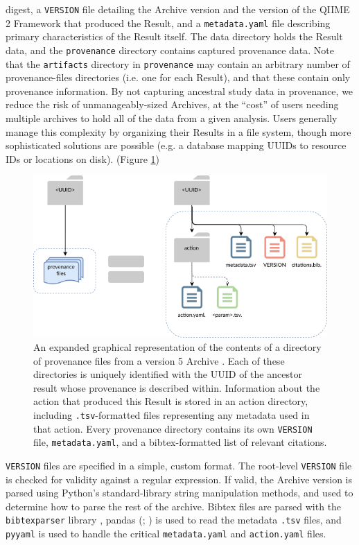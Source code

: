 digest, a \texttt{VERSION} file detailing the Archive version and the version of the
QIIME 2 Framework that produced the Result, and a \texttt{metadata.yaml} file describing
primary characteristics of the Result itself. The data directory holds the
Result data, and the \texttt{provenance} directory contains captured provenance data.
Note that the \texttt{artifacts} directory in \texttt{provenance} may contain an arbitrary number of
provenance-files directories (i.e. one for each Result), and that these contain only provenance
information. By not capturing ancestral study data in provenance, we reduce the risk
of unmanageably-sized Archives, at the “cost” of users needing multiple archives
to hold all of the data from a given analysis. Users generally manage this
complexity by organizing their Results in a file system, though more
sophisticated solutions are possible (e.g. a database mapping UUIDs to resource
IDs or locations on disk). (Figure \ref{fig:provenance_files})

\begin{figure}[htp]
\centering
\includegraphics[width=\textwidth]{figures/prov_files.png}
\caption[Diagram of the provenance file directories in a QIIME 2 Archive]%
{An expanded graphical representation of the contents of a directory of
provenance files from a version 5 Archive \parencite{qiime_2_development_team_archive_2018}.
Each of these directories is uniquely
identified with the UUID of the ancestor result whose provenance is described
within. Information about the action that produced this Result is stored in an
action directory, including \texttt{.tsv}-formatted files representing any metadata used
in that action. Every provenance directory contains its own \texttt{VERSION} file,
\texttt{metadata.yaml}, and a bibtex-formatted list of relevant citations.}
\label{fig:provenance_files}
\end{figure}
\texttt{VERSION} files are specified in a simple, custom format. The root-level \texttt{VERSION}
file is checked for validity against a regular expression. If valid, the Archive
version is parsed using Python’s standard-library string manipulation methods,
and used to determine how to parse the rest of the archive. Bibtex files are
parsed with the \texttt{bibtexparser} library \parencite{boulogne_bibtexparser_nodate},
pandas (\cite{reback_pandas-devpandas_2020}; \cite{mckinney_data_2010}) is used to read the
metadata \texttt{.tsv} files, and \texttt{pyyaml} is used to handle the critical \texttt{metadata.yaml} and
\texttt{action.yaml} files.


